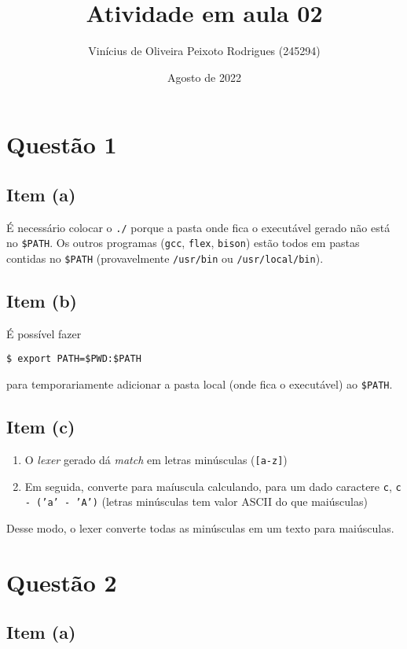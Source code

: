 \documentclass{article}
\title{Atividade em aula 02}
\author{Vinícius de Oliveira Peixoto Rodrigues (245294)}
\date{Agosto de 2022}
\begin{document}
\maketitle

\section*{Questão 1}
\subsection*{Item (a)}

É necessário colocar o \texttt{./} porque a pasta onde fica o executável gerado não está no \texttt{\$PATH}. Os outros programas (\texttt{gcc}, \texttt{flex}, \texttt{bison}) estão todos em pastas contidas no \texttt{\$PATH} (provavelmente \texttt{/usr/bin} ou \texttt{/usr/local/bin}).

\subsection*{Item (b)}

É possível fazer

\begin{center}
    \texttt{\$ export PATH=\$PWD:\$PATH}
\end{center}

para temporariamente adicionar a pasta local (onde fica o executável) ao \texttt{\$PATH}.

\subsection*{Item (c)}

\begin{enumerate}
    \item O \textit{lexer} gerado dá \textit{match} em letras minúsculas (\texttt{[a-z]})
    \item Em seguida, converte para maíuscula calculando, para um dado caractere \texttt{c}, \texttt{c - ('a' - 'A')} (letras minúsculas tem valor ASCII do que maiúsculas)
\end{enumerate}

Desse modo, o lexer converte todas as minúsculas em um texto para maiúsculas.

\section*{Questão 2}
\subsection*{Item (a)}
\end{document}
